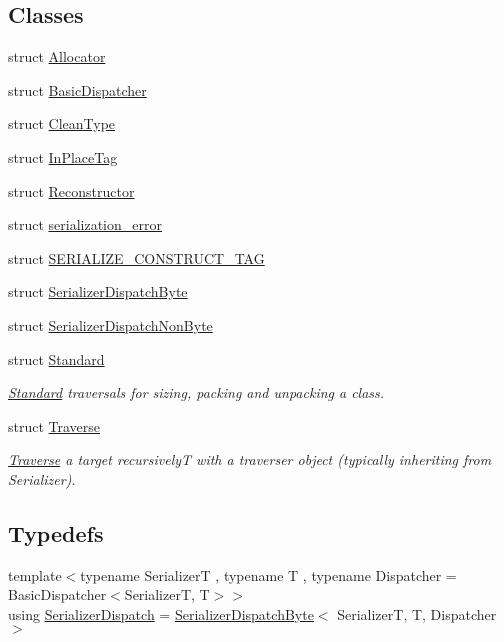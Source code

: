\subsection*{Classes}
\begin{DoxyCompactItemize}
\item 
struct \hyperlink{structcheckpoint_1_1dispatch_1_1_allocator}{Allocator}
\item 
struct \hyperlink{structcheckpoint_1_1dispatch_1_1_basic_dispatcher}{Basic\+Dispatcher}
\item 
struct \hyperlink{structcheckpoint_1_1dispatch_1_1_clean_type}{Clean\+Type}
\item 
struct \hyperlink{structcheckpoint_1_1dispatch_1_1_in_place_tag}{In\+Place\+Tag}
\item 
struct \hyperlink{structcheckpoint_1_1dispatch_1_1_reconstructor}{Reconstructor}
\item 
struct \hyperlink{structcheckpoint_1_1dispatch_1_1serialization__error}{serialization\+\_\+error}
\item 
struct \hyperlink{structcheckpoint_1_1dispatch_1_1_s_e_r_i_a_l_i_z_e___c_o_n_s_t_r_u_c_t___t_a_g}{S\+E\+R\+I\+A\+L\+I\+Z\+E\+\_\+\+C\+O\+N\+S\+T\+R\+U\+C\+T\+\_\+\+T\+AG}
\item 
struct \hyperlink{structcheckpoint_1_1dispatch_1_1_serializer_dispatch_byte}{Serializer\+Dispatch\+Byte}
\item 
struct \hyperlink{structcheckpoint_1_1dispatch_1_1_serializer_dispatch_non_byte}{Serializer\+Dispatch\+Non\+Byte}
\item 
struct \hyperlink{structcheckpoint_1_1dispatch_1_1_standard}{Standard}
\begin{DoxyCompactList}\small\item\em \hyperlink{structcheckpoint_1_1dispatch_1_1_standard}{Standard} traversals for sizing, packing and unpacking a class. \end{DoxyCompactList}\item 
struct \hyperlink{structcheckpoint_1_1dispatch_1_1_traverse}{Traverse}
\begin{DoxyCompactList}\small\item\em \hyperlink{structcheckpoint_1_1dispatch_1_1_traverse}{Traverse} a target recursively{\ttfamily T} with a traverser object (typically inheriting from {\ttfamily Serializer}). \end{DoxyCompactList}\end{DoxyCompactItemize}
\subsection*{Typedefs}
\begin{DoxyCompactItemize}
\item 
{\footnotesize template$<$typename SerializerT , typename T , typename Dispatcher  = Basic\+Dispatcher$<$\+Serializer\+T, T$>$$>$ }\\using \hyperlink{namespacecheckpoint_1_1dispatch_ae3a710db2b07fd1322ab9e6b3bbf45b4}{Serializer\+Dispatch} = \hyperlink{structcheckpoint_1_1dispatch_1_1_serializer_dispatch_byte}{Serializer\+Dispatch\+Byte}$<$ SerializerT, T, Dispatcher $>$
\end{DoxyCompactItemize}
